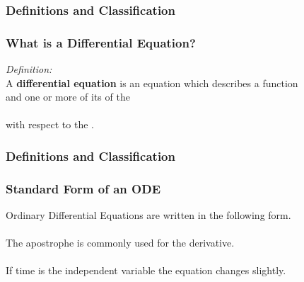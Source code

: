 \documentclass[fleqn]{beamer} %
\newcommand{\sectionIsubsectionItitle}{Definitions and Classification}
\begin{document}
			\begin{frame}
				\frametitle{\sectionIsubsectionItitle}
				\bigskip

 				\frametitle{What is a Differential Equation?}
  				{\it Definition:\vspace{3mm}\\}
  				A {\bf differential equation} is an equation which describes a function \vspace{3mm}\\and one or more of its \underline{\hspace{50mm}} of the \vspace{3mm}\\ \underline{\hspace{50mm}}\hspace{3mm}\underline{\hspace{50mm}}\vspace{5mm} \\ with respect to the \underline{\hspace{60mm}}.
	
				\btVFill
			\end{frame}

			\begin{frame}
				\frametitle{\sectionIsubsectionItitle}
				\bigskip

				  \frametitle{Standard Form of an ODE}

				  Ordinary Differential Equations are written in the following form.\vspace{3mm}\\

					\vspace{0mm}\\		

				The apostrophe is commonly used for the derivative. \vspace{2mm}\\

				 \vspace{3mm}\\

				If time is the independent variable the equation changes slightly. \vspace{2mm}\\
 
  
				\btVFill
			\end{frame}
\end{document}
